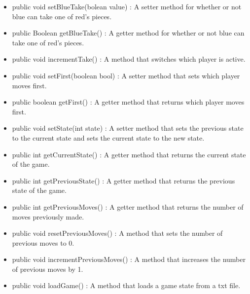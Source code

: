 \documentclass[12pt]{article}
\begin{document}
\begin{itemize}
\begin{itemize}
			\item public void setBlueTake(bolean value) : A setter method for whether or not blue can take one of red’s pieces.
			\item public Boolean getBlueTake() : A getter method for whether or not blue can take one of red’s pieces.
			\item public void incrementTake() : A method that switches which player is active.
			\item public void setFirst(boolean bool) : A setter method that sets which player moves first.
			\item public boolean getFirst() : A getter method that returns which player moves first.
			\item public void setState(int state) : A setter method that sets the previous state to the current state and sets the current state to the new state.
			\item public int getCurrentState() : A getter method that returns the current state of the game.
			\item public int getPreviousState() : A getter method that returns the previous state of the game.
			\item public int getPreviousMoves() : A getter method that returns the number of moves previously made.
			\item public void resetPreviousMoves() : A method that sets the number of previous moves to 0.
			\item public void incrementPreviousMoves() : A method that increases the number of previous moves by 1.
			\item public void loadGame() : A method that loads a game state from a txt file.
		\end{itemize}

	\end{itemize}
		
\end{document}
